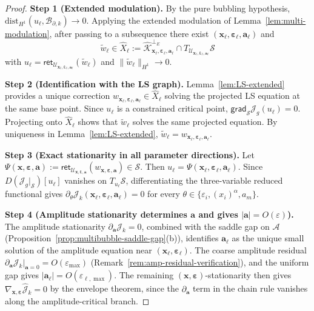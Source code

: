 \documentclass[11pt,reqno,a4paper]{amsart}
\numberwithin{equation}{section}
\theoremstyle{plain}
\theoremstyle{remark}
\theoremstyle{plain}
\begin{document}
\begin{proof}
\textbf{Step 1 (Extended modulation).}
By the pure bubbling hypothesis, $\mathrm{dist}_{H^1}(u_\ell,\mathcal B_{\partial,k})\to0$.
Applying the extended modulation of Lemma~\ref{lem:multi-modulation},
after passing to a subsequence there exist
$(\mathbf x_\ell,\boldsymbol\varepsilon_\ell,\mathbf a_\ell)$ and
\[
\widetilde w_\ell\in\widehat X_\ell
:=\widehat{\mathcal K}_{\mathbf x_\ell,\boldsymbol\varepsilon_\ell,\mathbf a_\ell}^{\perp_E}\cap
T_{\mathcal U_{\mathbf x_\ell,\boldsymbol\varepsilon_\ell,\mathbf a_\ell}}\mathcal S
\]
with
$u_\ell=\mathsf{ret}_{\mathcal U_{\mathbf x_\ell,\boldsymbol\varepsilon_\ell,\mathbf a_\ell}}(\widetilde w_\ell)$
and $\|\widetilde w_\ell\|_{H^1}\to0$.

\textbf{Step 2 (Identification with the LS graph).}
Lemma~\ref{lem:LS-extended} provides a unique correction
$w_{\mathbf x_\ell,\boldsymbol\varepsilon_\ell,\mathbf a_\ell}\in\widehat X_\ell$
solving the projected LS equation at the same base point.
Since $u_\ell$ is a constrained critical point,
$\mathsf{grad}_{\mathcal S}\mathcal J_g(u_\ell)=0$.
Projecting onto $\widehat X_\ell$ shows that $\widetilde w_\ell$ solves the same projected equation.
By uniqueness in Lemma~\ref{lem:LS-extended},
$\widetilde w_\ell=w_{\mathbf x_\ell,\boldsymbol\varepsilon_\ell,\mathbf a_\ell}$.

\textbf{Step 3 (Exact stationarity in all parameter directions).}
Let
$\Psi(\mathbf x,\boldsymbol\varepsilon,\mathbf a)
:=\mathsf{ret}_{\mathcal U_{\mathbf x,\boldsymbol\varepsilon,\mathbf a}}
(w_{\mathbf x,\boldsymbol\varepsilon,\mathbf a})\in\mathcal S$.
Then $u_\ell=\Psi(\mathbf x_\ell,\boldsymbol\varepsilon_\ell,\mathbf a_\ell)$.
Since $D(\mathcal J_g|_{\mathcal S})[u_\ell]$ vanishes on $T_{u_\ell}\mathcal S$,
differentiating the three-variable reduced functional gives
$\partial_\theta\mathcal J_k(\mathbf x_\ell,\boldsymbol\varepsilon_\ell,\mathbf a_\ell)=0$
for every $\theta\in\{\varepsilon_i,(x_i)^\alpha,a_m\}$.

\textbf{Step 4 (Amplitude stationarity determines $\mathbf a$ and gives $|\mathbf a|=O(\varepsilon)$).}
The amplitude stationarity $\partial_{\mathbf a}\mathcal J_k=0$,
combined with the saddle gap on $\mathcal A$
(Proposition~\ref{prop:multibubble-saddle-gap}\textup{(b)}),
identifies $\mathbf a_\ell$ as the unique small solution of the amplitude equation
near $(\mathbf x_\ell,\boldsymbol\varepsilon_\ell)$.
The coarse amplitude residual $\partial_{\mathbf a}\mathcal J_k|_{\mathbf a=0}=O(\varepsilon_{\max})$
(Remark~\ref{rem:amp-residual-verification}),
and the uniform gap gives $|\mathbf a_\ell|=O(\varepsilon_{\ell,\max})$.
The remaining $(\mathbf x,\boldsymbol\varepsilon)$-stationarity then gives
$\nabla_{\mathbf x,\boldsymbol\varepsilon}\hat{\mathcal J}_k=0$
by the envelope theorem, since the $\partial_{\mathbf a}$ term in the chain rule
vanishes along the amplitude-critical branch.
\end{proof}
\end{document}
